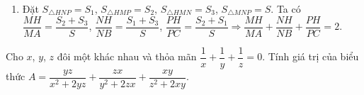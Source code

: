 \begin{ex}
{\begin{enumerate}
Mà $ \widehat{MBC}+\widehat{BCN}=\widehat{ABP}+\widehat{ABN}=90^\circ $.\hfill$ (3) $\\
Từ $ (1) $, $ (2) $, $ (3) $ ta suy ra $ \widehat{NBC}=\widehat{NBA}\Rightarrow BN $ là tia phân giác góc $ \widehat{CBA} $.
\item Đặt $ S_{\triangle HNP}=S_{1} $, $ S_{\triangle HMP}=S_{2} $, $ S_{\triangle HMN}=S_{3} $, $ S_{\triangle MNP}=S $. Ta có\\
$ \dfrac{MH}{MA}=\dfrac{S_2+S_3}{S} $, $ \dfrac{NH}{NB}=\dfrac{S_1+S_3}{S} $, $ \dfrac{PH}{PC}=\dfrac{S_2+S_1}{S}\Rightarrow \dfrac{MH}{MA}+\dfrac{NH}{NB}+\dfrac{PH}{PC}=2 $.
\end{enumerate}
}
\end{ex}
\begin{ex}%
	Cho $ x $, $ y $, $ z $ đôi một khác nhau và thỏa mãn $ \dfrac{1}{x}+\dfrac{1}{y}+\dfrac{1}{z}=0 $. Tính giá trị của biểu thức $ A=\dfrac{yz}{x^{2}+2yz}+\dfrac{zx}{y^{2}+2zx}+\dfrac{xy}{z^{2}+2xy} $.
\end{ex}